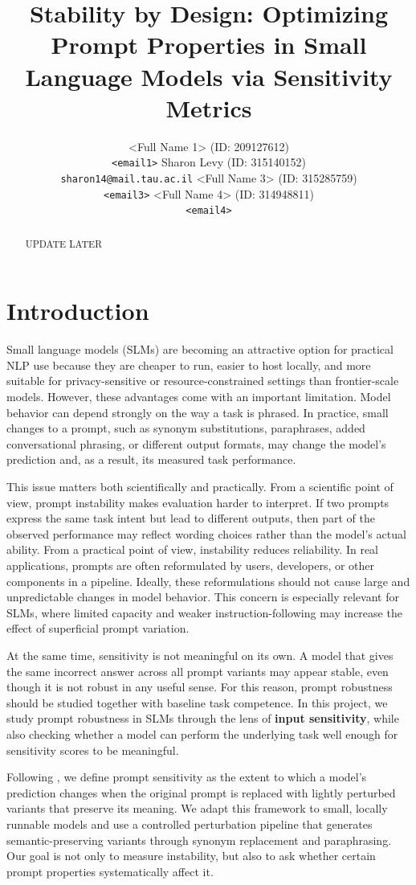 \documentclass[11pt]{article}
\title{Stability by Design: Optimizing Prompt Properties in Small Language Models via Sensitivity Metrics}
\author{
<Full Name 1> (ID: 209127612) \\
\texttt{<email1>}
\And
Sharon Levy (ID: 315140152) \\
\texttt{sharon14@mail.tau.ac.il}
\AND
<Full Name 3> (ID: 315285759) \\
\texttt{<email3>}
\And
<Full Name 4> (ID: 314948811) \\
\texttt{<email4>}
\\[0.5em]
\multicolumn{2}{c}{\textbf{Moodle Group Number: <GROUP NUMBER>}}
}
\begin{document}
\maketitle

\begin{abstract}
UPDATE LATER
\end{abstract}

\section{Introduction}

Small language models (SLMs) are becoming an attractive option for practical NLP use because they are cheaper to run, easier to host locally, and more suitable for privacy-sensitive or resource-constrained settings than frontier-scale models. However, these advantages come with an important limitation. Model behavior can depend strongly on the way a task is phrased. In practice, small changes to a prompt, such as synonym substitutions, paraphrases, added conversational phrasing, or different output formats, may change the model's prediction and, as a result, its measured task performance.

This issue matters both scientifically and practically. From a scientific point of view, prompt instability makes evaluation harder to interpret. If two prompts express the same task intent but lead to different outputs, then part of the observed performance may reflect wording choices rather than the model's actual ability. From a practical point of view, instability reduces reliability. In real applications, prompts are often reformulated by users, developers, or other components in a pipeline. Ideally, these reformulations should not cause large and unpredictable changes in model behavior. This concern is especially relevant for SLMs, where limited capacity and weaker instruction-following may increase the effect of superficial prompt variation.

At the same time, sensitivity is not meaningful on its own. A model that gives the same incorrect answer across all prompt variants may appear stable, even though it is not robust in any useful sense. For this reason, prompt robustness should be studied together with baseline task competence. In this project, we study prompt robustness in SLMs through the lens of \textbf{input sensitivity}, while also checking whether a model can perform the underlying task well enough for sensitivity scores to be meaningful.

Following \citet{lu-etal-2024-prompts}, we define prompt sensitivity as the extent to which a model's prediction changes when the original prompt is replaced with lightly perturbed variants that preserve its meaning. We adapt this framework to small, locally runnable models and use a controlled perturbation pipeline that generates semantic-preserving variants through synonym replacement and paraphrasing. Our goal is not only to measure instability, but also to ask whether certain prompt properties systematically affect it.
\end{document}
